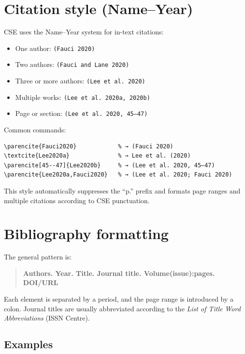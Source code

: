\documentclass[11pt]{article}
\begin{document}
\section{Citation style (Name–Year)}

CSE uses the Name--Year system for in-text citations:
\begin{itemize}
  \item One author: \texttt{(Fauci 2020)}
  \item Two authors: \texttt{(Fauci and Lane 2020)}
  \item Three or more authors: \texttt{(Lee et al.\ 2020)}
  \item Multiple works: \texttt{(Lee et al.\ 2020a, 2020b)}
  \item Page or section: \texttt{(Lee et al.\ 2020, 45–47)}
\end{itemize}

Common commands:
\begin{verbatim}
\parencite{Fauci2020}            % → (Fauci 2020)
\textcite{Lee2020a}              % → Lee et al. (2020)
\parencite[45--47]{Lee2020b}     % → (Lee et al. 2020, 45–47)
\parencite{Lee2020a,Fauci2020}   % → (Lee et al. 2020; Fauci 2020)
\end{verbatim}

This style automatically suppresses the “p.” prefix and formats page ranges and multiple citations according to CSE punctuation.

\section{Bibliography formatting}

The general pattern is:

\begin{quote}
\textbf{Authors. Year. Title. Journal title. Volume(issue):pages. DOI/URL}
\end{quote}

Each element is separated by a period, and the page range is introduced by a colon.  
Journal titles are usually abbreviated according to the \emph{List of Title Word Abbreviations} (ISSN Centre).

\subsection*{Examples}
\end{document}
